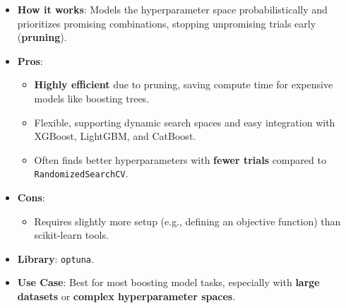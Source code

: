 \documentclass[
  letterpaper,
  DIV=11,
  numbers=noendperiod]{scrreprt}
\providecommand{\tightlist}{%
  \setlength{\itemsep}{0pt}\setlength{\parskip}{0pt}}\usepackage{longtable,booktabs,array}
\begin{document}
\begin{itemize}
\item
  \textbf{How it works}: Models the hyperparameter space
  probabilistically and prioritizes promising combinations, stopping
  unpromising trials early (\textbf{pruning}).
\item
  \textbf{Pros}:

  \begin{itemize}
  \tightlist
  \item
    \textbf{Highly efficient} due to pruning, saving compute time for
    expensive models like boosting trees.
  \item
    Flexible, supporting dynamic search spaces and easy integration with
    XGBoost, LightGBM, and CatBoost.
  \item
    Often finds better hyperparameters with \textbf{fewer trials}
    compared to \texttt{RandomizedSearchCV}.
  \end{itemize}
\item
  \textbf{Cons}:

  \begin{itemize}
  \tightlist
  \item
    Requires slightly more setup (e.g., defining an objective function)
    than scikit-learn tools.
  \end{itemize}
\item
  \textbf{Library}: \texttt{optuna}.
\item
  \textbf{Use Case}: Best for most boosting model tasks, especially with
  \textbf{large datasets} or \textbf{complex hyperparameter spaces}.
\end{itemize}
\end{document}
